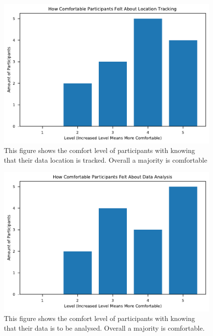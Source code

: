 \documentclass{l4proj}
\begin{document}
\begin{appendices}
\begin{figure}[htb]
    \centering
    \includegraphics[width=\linewidth]{images/survey/location_tracking_comfort.pdf}
    \caption{This figure shows the comfort level of participants with knowing that their data location is tracked. Overall a majority is comfortable}
    \label{fig:location_tracking_comfort} 
\end{figure}

\begin{figure}[htb]
    \centering
    \includegraphics[width=\linewidth]{images/survey/data_analysis_comfort.pdf}
    \caption{This figure shows the comfort level of participants with knowing that their data is to be analysed. Overall a majority is comfortable.}
    \label{fig:data_analysis_comfort} 
\end{figure}


\end{appendices}
\end{document}
